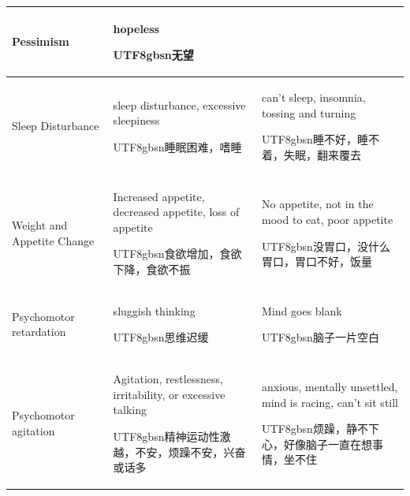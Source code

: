 \begin{table}[th]
\begin{tabular}{|m{2.8cm}|m{4cm} | m{4cm}| }
    \hline
    Pessimism & \makecell[c{p{4cm}}]{hopeless\\ \begin{CJK*}{UTF8}{gbsn}无望\end{CJK*}} & \\
    \hline
    Sleep Disturbance & \makecell[c{p{4cm}}]{sleep disturbance, excessive sleepiness\\ \begin{CJK*}{UTF8}{gbsn}睡眠困难，嗜睡\end{CJK*}} & \makecell[c{p{4cm}}]{can't sleep, insomnia, tossing and turning\\ \begin{CJK*}{UTF8}{gbsn}睡不好，睡不着，失眠，翻来覆去\end{CJK*}} \\
   \hline
    Weight and Appetite Change & \makecell[c{p{4cm}}]{Increased appetite, decreased appetite, loss of appetite\\ \begin{CJK*}{UTF8}{gbsn}食欲增加，食欲下降，食欲不振\end{CJK*}} & \makecell[c{p{4cm}}]{No appetite, not in the mood to eat, poor appetite\\ \begin{CJK*}{UTF8}{gbsn}没胃口，没什么胃口，胃口不好，饭量\end{CJK*}} \\
    \hline
    Psychomotor retardation &\makecell[c{p{4cm}}]{sluggish thinking\\ \begin{CJK*}{UTF8}{gbsn}思维迟缓\end{CJK*}} & \makecell[c{p{4cm}}]{Mind goes blank\\ \begin{CJK*}{UTF8}{gbsn}脑子一片空白\end{CJK*}} \\
    \hline
    Psychomotor agitation & \makecell[c{p{4cm}}]{Agitation, restlessness, irritability, or excessive talking\\ \begin{CJK*}{UTF8}{gbsn}精神运动性激越，不安，烦躁不安，兴奋或话多\end{CJK*}} & \makecell[c{p{4cm}}]{anxious, mentally unsettled, mind is racing, can't sit still\\ \begin{CJK*}{UTF8}{gbsn}烦躁，静不下心，好像脑子一直在想事情，坐不住\end{CJK*}} \\
    \hline

\end{tabular}
\end{table}
